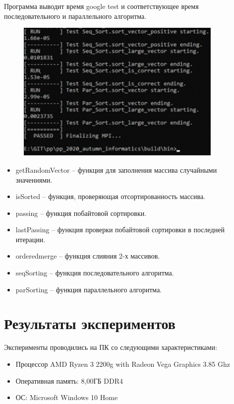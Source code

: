 \documentclass{report}
\begin{document}
\par Программа выводит время google test и соответствующее время последовательного и параллельного алгоритма.

\begin{figure}[htp]
    \centering
    \includegraphics[width=10cm]{image10}
    \label{fig:galaxy}
\end{figure}

\begin{itemize}

\item getRandomVector – функция для заполнения массива случайными значениями. 
\item isSorted – функция, проверяющая отсортированность массива.
\item passing – функция побайтовой сортировки.
\item lastPassing – функция проверки побайтовой сортировки в последней итерации.
\item orderedmerge – функция слияния 2-х массивов.
\item seqSorting – функция последовательного алгоритма.
\item parSorting – функция параллельного алгоритма.

\end{itemize}
\newpage

\section*{Результаты экспериментов}
Эксперименты проводились на ПК со следующими характеристиками:

\begin{itemize}
\item Процессор AMD Ryzen 3 2200g with Radeon Vega Graphics 3.85 Ghz
\item Оперативная память: 8,00ГБ DDR4
\item ОС: Microsoft Windows 10 Home
\end{itemize}
\end{document}
